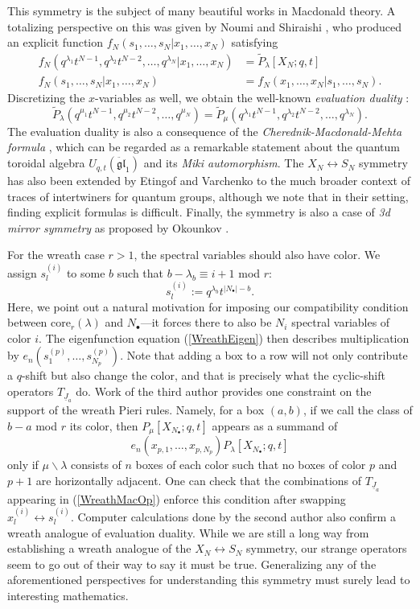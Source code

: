 \documentclass{amsart}
\newcommand{\core}{\mathrm{core}}
\newcommand{\Ju}{{\underline{J}}}
\theoremstyle{remark}
\numberwithin{thm}{section}
\numberwithin{equation}{section}
\begin{document}
This symmetry is the subject of many beautiful works in Macdonald theory.
A totalizing perspective on this was given by Noumi and Shiraishi \cite{NS}, who produced an explicit function $f_N(s_1,\ldots, s_N|x_1,\ldots, x_N)$
satisfying
\begin{align*}
f_N(q^{\lambda_1}t^{N-1},q^{\lambda_2}t^{N-2},\ldots, q^{\lambda_N}|x_1,\ldots, x_N)&= \tilde{P}_\lambda[X_N;q,t]\\
f_N(s_1,\ldots, s_N|x_1,\ldots, x_N)&= f_N(x_1,\ldots, x_N|s_1,\ldots, s_N).
\end{align*}
Discretizing the $x$-variables as well, we obtain the well-known \textit{evaluation duality} \cite{Mac}:
\[
\tilde{P}_\lambda(q^{\mu_1}t^{N-1},q^{\mu_2}t^{N-2},\ldots, q^{\mu_N})=\tilde{P}_\mu(q^{\lambda_1}t^{N-1},q^{\lambda_2}t^{N-2},\ldots, q^{\lambda_N}).
\]
The evaluation duality is also a consequence of the \textit{Cherednik-Macdonald-Mehta formula} \cite{C}, which can be regarded as a remarkable statement about the quantum toroidal algebra $U_{q,t}(\ddot{\mathfrak{gl}}_1)$ and its \textit{Miki automorphism}.
The $X_N\leftrightarrow S_N$ symmetry has also been extended by Etingof and Varchenko \cite{EV} to the much broader context of traces of intertwiners for quantum groups, although we note that in their setting, finding explicit formulas is difficult.
Finally, the symmetry is also a case of \textit{3d mirror symmetry} as proposed by Okounkov \cite{AO}.

For the wreath case $r>1$, the spectral variables should also have color. 
We assign $s^{(i)}_{l}$ to some $b$ such that $b-\lambda_b\equiv i+1$ mod $r$:
\[
s^{(i)}_{l}:=q^{\lambda_b}t^{|N_\bullet|-b}.
\]
Here, we point out a natural motivation for imposing our compatibility condition between $\core_r(\lambda)$ and $N_\bullet$---it forces there to also be $N_i$ spectral variables of color $i$. 
The eigenfunction equation (\ref{WreathEigen}) then describes multiplication by $e_n(s^{(p)}_{1},\ldots, s^{(p)}_{N_p})$.
Note that adding a box to a row will not only contribute a $q$-shift but also change the color, and that is precisely what the cyclic-shift operators $T_{\Ju_a}$ do.
Work of the third author \cite{Wen} provides one constraint on the support of the wreath Pieri rules.
Namely, for a box $(a,b)$, if we call the class of $b-a$ mod $r$ its color, then $P_\mu[X_{N_\bullet};q,t]$ appears as a summand of
\[
e_n(x_{p,1},\ldots, x_{p,N_p})P_\lambda[X_{N_\bullet};q,t]
\]
only if $\mu\backslash\lambda$ consists of $n$ boxes of each color such that no boxes of color $p$ and $p+1$ are horizontally adjacent. 
One can check that the combinations of $T_{\Ju_a}$ appearing in (\ref{WreathMacOp}) enforce this condition after swapping $x^{(i)}_{l}\leftrightarrow s^{(i)}_{l}$.
Computer calculations done by the second author also confirm a wreath analogue of evaluation duality.
While we are still a long way from establishing a wreath analogue of the $X_N\leftrightarrow S_N$ symmetry, our strange operators seem to go out of their way to say it must be true.
Generalizing any of the aforementioned perspectives for understanding this symmetry must surely lead to interesting mathematics.
\end{document}
